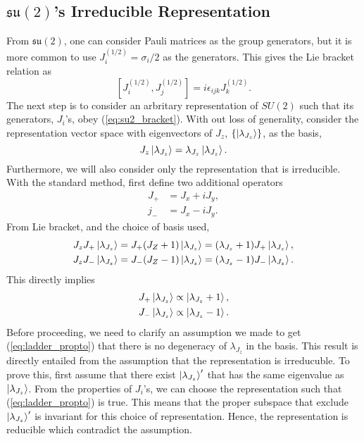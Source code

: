 \documentclass[preprint, 12pt]{revtex4-2}
\numberwithin{equation}{section}
\begin{document}
\subsection{$\mathfrak{su(2)}$'s Irreducible Representation}
From $\mathfrak{su(2)}$, one can consider Pauli matrices as the group generators, but it is more common to use $J^{(1/2)}_i = \sigma_i/2$ as the generators. This gives the Lie bracket relation as
\begin{equation} \label{eq:su2_bracket}
    \left[J^{(1/2)}_i, J^{(1/2)}_j\right] = i\epsilon_{ijk}J^{(1/2)}_k.
\end{equation}
The next step is to consider an arbritary representation of $SU(2)$ such that its generators, $J_i$'s, obey (\ref{eq:su2_bracket}). With out loss of generality, consider the representation vector space with eigenvectors of $J_z$, $\{\ket{\lambda_{J_z}}\}$, as the basis,
\begin{equation}
    J_z\ket{\lambda_{J_z}}=\lambda_{J_z}\ket{\lambda_{J_z}}.
\end{equation}
Furthermore, we will also consider only the representation that is irreducible. With the standard method, first define two additional operators
\begin{equation}
    \begin{aligned}
        J_+ &= J_x + iJ_y, \\
        j_- &= J_x - iJ_y.
    \end{aligned}
\end{equation}
From Lie bracket, and the choice of basis used,
\begin{equation}
    \begin{aligned}
        J_zJ_+\ket{\lambda_{J_z}} &= J_+(J_Z+1)\ket{\lambda_{J_z}} = (\lambda_{J_z}+1)J_+\ket{\lambda_{J_z}}, \\
        J_zJ_-\ket{\lambda_{J_z}} &= J_-(J_Z-1)\ket{\lambda_{J_z}} = (\lambda_{J_z}-1)J_-\ket{\lambda_{J_z}}.
    \end{aligned}
\end{equation}
This directly implies
\begin{equation} \label{eq:ladder_propto}
    \begin{aligned}
        J_+\ket{\lambda_{J_z}} &\propto \ket{\lambda_{J_z}+1}, \\
        J_-\ket{\lambda_{J_z}} &\propto \ket{\lambda_{J_z}-1}.
    \end{aligned}
\end{equation}
Before proceeding, we need to clarify an assumption we made to get (\ref{eq:ladder_propto}) that there is no degeneracy of $\lambda_{J_z}$ in the basis. This result is directly entailed from the assumption that the representation is irreducuble. To prove this, first assume that there exist $\ket{\lambda_{J_z}}'$ that has the same eigenvalue as $\ket{\lambda_{J_z}}$. From the properties of $J_i$'s, we can choose the representation such that (\ref{eq:ladder_propto}) is true. This means that the proper subspace that exclude $\ket{\lambda_{J_z}}'$ is invariant for this choice of representation. Hence, the representation is reducible which contradict the assumption.
\end{document}
